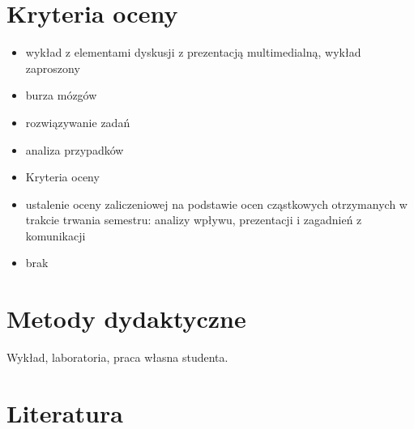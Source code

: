 \documentclass[12pt, a4paper]{article}
\begin{document}
\section{Kryteria oceny}

\begin{itemize}
  \item wykład z elementami dyskusji z prezentacją multimedialną, wykład zaproszony
  \item burza mózgów
  \item rozwiązywanie zadań
  \item analiza przypadków
  \item Kryteria oceny
  \item ustalenie oceny zaliczeniowej na podstawie ocen cząstkowych otrzymanych w trakcie trwania semestru: analizy wpływu, prezentacji i zagadnień z komunikacji
  \item brak
\end{itemize}

\section{Metody dydaktyczne}

Wykład, laboratoria, praca własna studenta.

\section{Literatura}
\end{document}
